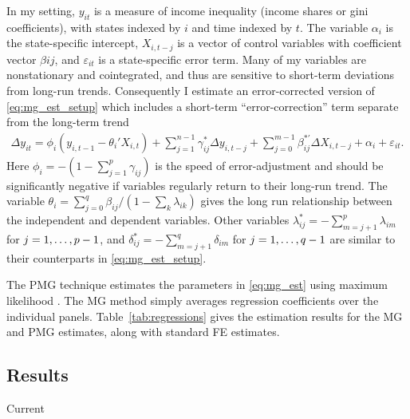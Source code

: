 \documentclass[11pt]{article}
\theoremstyle{definition}
\numberwithin{equation}{section}
\begin{document}
In my setting, $y_{it}$ is a measure of income inequality (income shares or gini coefficients), with states indexed by $i$ and time indexed by $t$. The variable $\alpha_{i}$ is the state-specific intercept, $X_{i,t-j}$ is a vector of control variables with coefficient vector $\beta{ij}$, and $\varepsilon_{it}$ is a state-specific error term. Many of my variables are nonstationary and cointegrated, and thus are sensitive to short-term deviations from long-run trends. Consequently I estimate an error-corrected version of \eqref{eq:mg_est_setup} which includes a short-term ``error-correction'' term separate from the long-term trend
\begin{eqnarray}\label{eq:mg_est}
\Delta y_{it} = \phi_{i}\left(y_{i,t-1} - \theta_i'X_{i,t} \right) +\sum_{j=1}^{n-1} \gamma^*_{ij} \Delta y_{i,t-j}+ \sum_{j=0}^{m-1} \beta^{*'}_{ij} \Delta X_{i,t-j} + \alpha_i +\varepsilon_{it}.
\end{eqnarray}
Here $\phi_{i} = -\left(  1-\sum_{j=1}^p \gamma_{ij} \right)$ is the speed of error-adjustment and should be significantly negative if variables regularly return to their long-run trend. The variable $\theta_i = \sum_{j=0}^q \beta_{ij}/\left(1-\sum_k\lambda_{ik}\right)$ gives the long run relationship between the independent and dependent variables. Other variables
$\lambda^*_{ij} = -\sum_{m=j+1}^p \lambda_{im}$ for $j=1,\mathellipsis, p-1$, and $\delta^*_{ij}=-\sum^q_{m=j+1}\delta_{im}$ for $j=1,\mathellipsis, q-1$ are similar to their counterparts in \eqref{eq:mg_est_setup}.

The PMG technique estimates the parameters in \eqref{eq:mg_est} using maximum likelihood \citep{pesaran1999pooled}. The MG method simply averages regression coefficients over the individual panels. Table~\ref{tab:regressions} gives the estimation results for the MG and PMG estimates, along with standard FE estimates. 



\subsection{Results}

\begin{footnotesize}
\begin{table}[htb!]
\centering
\caption{Current}\label{tab:regressions}

\end{table}
\end{footnotesize}
\end{document}
